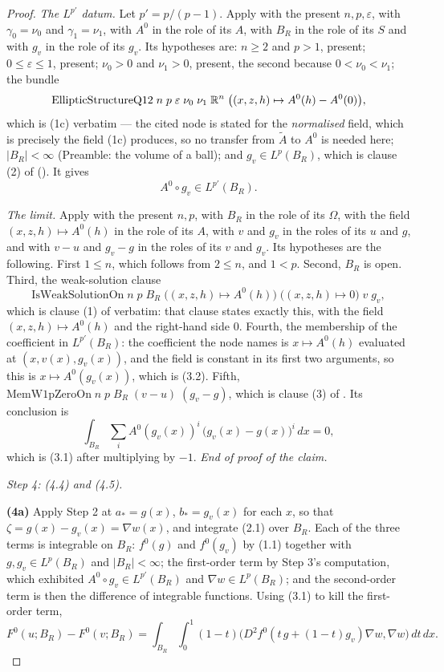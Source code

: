\begin{proof}
\emph{The $L^{p'}$ datum.}  Let $p'=p/(p-1)$.  Apply
 with the present $n,p,\varepsilon$, with
$\gamma_0=\nu_0$ and $\gamma_1=\nu_1$, with $A^0$ in the role of its $A$, with
$B_R$ in the role of its $S$ and with $g_v$ in the role of its $g_v$.  Its
hypotheses are: $n\ge2$ and $p>1$, present; $0\le\varepsilon\le1$, present;
$\nu_0>0$ and $\nu_1>0$, present, the second because $0<\nu_0<\nu_1$; the
bundle
\[
\mathrm{EllipticStructureQ12}\;n\;p\;\varepsilon\;\nu_0\;\nu_1\;\mathbb{R}^n\;
\bigl((x,z,h)\mapsto A^0(h)-A^0(0)\bigr),
\]
which is (1c) verbatim --- the cited node is stated for the \emph{normalised}
field, which is precisely the field (1c) produces, so no transfer from
$\widetilde A$ to $A^0$ is needed here; $|B_R|<\infty$ (Preamble: the volume of
a ball); and $g_v\in L^p(B_R)$, which is clause (2) of
 ().  It gives
\[
A^0\circ g_v\in L^{p'}(B_R).
\tag{3.2}
\]

\emph{The limit.}  Apply  with the present $n,p$,
with $B_R$ in the role of its $\Omega$, with the field
$(x,z,h)\mapsto A^0(h)$ in the role of its $A$, with $v$ and $g_v$ in the roles
of its $u$ and $g$, and with $v-u$ and $g_v-g$ in the roles of its $v$ and
$g_v$.  Its hypotheses are the following.  First $1\le n$, which follows from
$2\le n$, and $1<p$.  Second, $B_R$ is open.  Third, the weak-solution clause
\[
\mathrm{IsWeakSolutionOn}\;n\;p\;B_R\;\bigl((x,z,h)\mapsto A^0(h)\bigr)\;
\bigl((x,z,h)\mapsto0\bigr)\;v\;g_v ,
\]
which is clause (1) of  verbatim: that clause
states exactly this, with the field $(x,z,h)\mapsto A^0(h)$ and the right-hand
side $0$.  Fourth, the membership of the coefficient in $L^{p'}(B_R)$: the
coefficient the node names is $x\mapsto A^0(h)$ evaluated at
$(x,v(x),g_v(x))$, and the field is constant in its first two arguments, so
this is $x\mapsto A^0(g_v(x))$, which is (3.2).  Fifth,
$\mathrm{MemW1pZeroOn}\;n\;p\;B_R\;(v-u)\;(g_v-g)$, which is clause (3) of
.  Its conclusion is
\[
\int_{B_R}\sum_iA^0(g_v(x))^i\,\bigl(g_v(x)-g(x)\bigr)^i\,dx=0 ,
\]
which is (3.1) after multiplying by $-1$.  \emph{End of proof of the claim.}

\medskip
\noindent\emph{Step 4: \textup{(4.4)} and \textup{(4.5)}.}

\textbf{(4a)} Apply Step 2 at $a_\ast=g(x)$, $b_\ast=g_v(x)$ for each $x$, so
that $\zeta=g(x)-g_v(x)=\nabla w(x)$, and integrate (2.1) over $B_R$.  Each of
the three terms is integrable on $B_R$: $f^0(g)$ and $f^0(g_v)$ by (1.1)
together with $g,g_v\in L^p(B_R)$ and $|B_R|<\infty$; the first-order term by
Step 3's computation, which exhibited $A^0\circ g_v\in L^{p'}(B_R)$ and
$\nabla w\in L^p(B_R)$; and the second-order term is then the difference of
integrable functions.  Using (3.1) to kill the first-order term,
\[
F^0(u;B_R)-F^0(v;B_R)
=\int_{B_R}\int_0^1(1-t)\bigl(D^2f^0(t\,g+(1-t)g_v)\nabla w,\nabla w\bigr)\,dt\,dx .
\tag{4.1}
\]


\end{proof}
